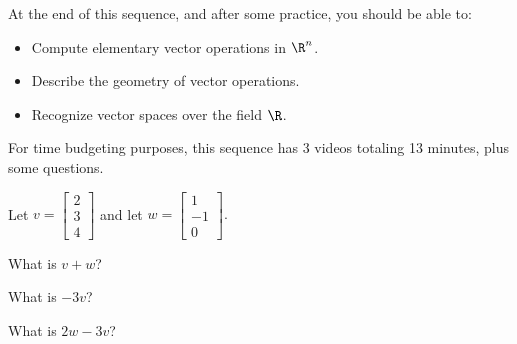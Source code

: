 







At the end of this sequence, and after some practice, you should be able to:

\begin{itemize}
\item Compute elementary vector operations in $\R^n$.  
\item Describe the geometry of vector operations.
\item Recognize vector spaces over the field $\R$.  
\end{itemize}


For time budgeting purposes, this sequence has 3 videos totaling 13 minutes, 
plus some questions.  




\endedxtext

\endedxvertical









Let $v = \left[\begin{array}{c} 2 \\ 3  \\ 4 \end{array} \right]$ and let 
$w = \left[\begin{array}{c} 1 \\ -1  \\ 0 \end{array} \right].$





What is $v+w$?  



What is $-3v$?  



What is $2w-3v$?  





